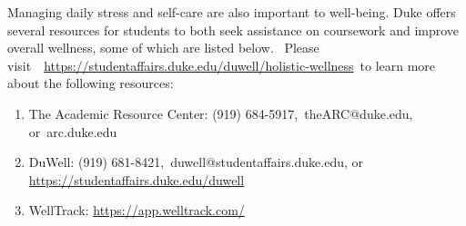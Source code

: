 \documentclass[11pt]{article}
\begin{document}
Managing daily stress and self-care are also important to well-being. Duke offers several resources for students to both seek assistance on coursework and improve overall wellness, some of which are listed below.  Please visit  \url{https://studentaffairs.duke.edu/duwell/holistic-wellness} to learn more about the following resources: 


\begin{enumerate}
\item The Academic Resource Center: (919) 684-5917, theARC@duke.edu, or arc.duke.edu
\item DuWell: (919) 681-8421, duwell@studentaffairs.duke.edu, or  
\url{https://studentaffairs.duke.edu/duwell}
\item WellTrack: \url{https://app.welltrack.com/}
\end{enumerate} 
\end{document}
